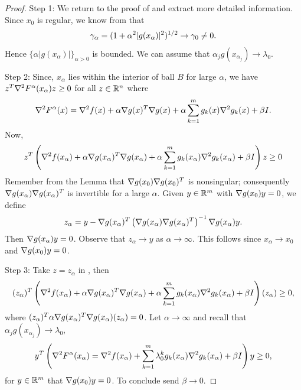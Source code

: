 \begin{proof}
Step 1: We return to the proof of  and extract more detailed information. 
Since $x_0$ is regular, we know from  that
\begin{align}
\gamma_\alpha = (1+\alpha^2|g(x_\alpha)|^2)^{1/2} \to \gamma_0 \neq 0.
\labeq{proof_csvf_eq_1}
\end{align}
Hence $\{ \alpha |g(x_\alpha)| \}_{\alpha > 0}$ is bounded. 
We can assume that $\alpha_j g(x_{\alpha_j}) \to \lambda_0$.

Step 2: Since, $x_\alpha$ lies within the interior of ball $B$ for large $\alpha$, we have $z^T \nabla ^2 F^\alpha (x_\alpha) z \ge 0$ for all $z \in \mathbb{R}^n$ where
\begin{align}
\grad ^2 F^\alpha (x) = \grad^2 f(x) + \alpha \grad g(x)^T \grad g(x) + \alpha \sum _{k=1} ^{m} g_k (x) \grad^2 g_k(x) + \beta I.
\labeq{proof_csvf_eq_2}
\end{align}
Now, 
\begin{align}
z^T \left( \grad^2 f(x_\alpha) + \alpha \grad g(x_\alpha)^T \grad g(x_\alpha) + \alpha \sum _{k=1} ^{m} g_k (x_\alpha) \grad^2 g_k(x_\alpha) + \beta I \right) z \ge 0
\labeq{proof_csvf_eq_3}
\end{align}
Remember from the Lemma that $\nabla g(x_0) \nabla g(x_0)^T$ is nonsingular; consequently $\nabla g(x_\alpha) \nabla g(x_\alpha)^T$ is invertible for a large $\alpha$.
Given $y \in \mathbb{R}^m$ with $\nabla g(x_0) y = 0$, we define
\begin{align}
z_\alpha = y - \grad g(x_\alpha)^T \left( \grad g(x_\alpha) \grad g(x_\alpha)^T \right) ^{-1} \grad g(x_\alpha) y.
\labeq{proof_csvf_eq_4}
\end{align}
Then $\nabla g(x_\alpha) y = 0$.
Observe that $z_\alpha \to y$ as $\alpha \to \infty$.
This follows since $x_\alpha \to x_0$ and $\nabla g(x_0) y = 0$.

Step 3: Take $z = z_\alpha$ in , then
\begin{align}
(z_\alpha)^T \left( \grad^2 f(x_\alpha) + \alpha \grad g(x_\alpha)^T \grad g(x_\alpha) + \alpha \sum _{k=1} ^{m} g_k (x_\alpha) \grad^2 g_k(x_\alpha) + \beta I \right) (z_\alpha) \ge 0,
\labeq{proof_csvf_eq_5}
\end{align}
where $(z_\alpha)^T \alpha \nabla g(x_\alpha)^T \nabla g(x_\alpha) (z_\alpha) = 0$.
Let $\alpha \to \infty$ and recall that $\alpha_j g(x_{\alpha_j}) \to \lambda_0$,
\begin{align}
y^T \left( \nabla ^2 F^\alpha (x_\alpha) = \nabla^2 f(x_\alpha) + \sum _{k=1} ^{m} \lambda_0^k g_k (x_\alpha) \nabla^2 g_k(x_\alpha) + \beta I \right) y \ge 0,
\end{align}
for $y \in \mathbb{R}^m$ that $\nabla g(x_0) y = 0$.
To conclude send $\beta \to 0$.
\end{proof}

